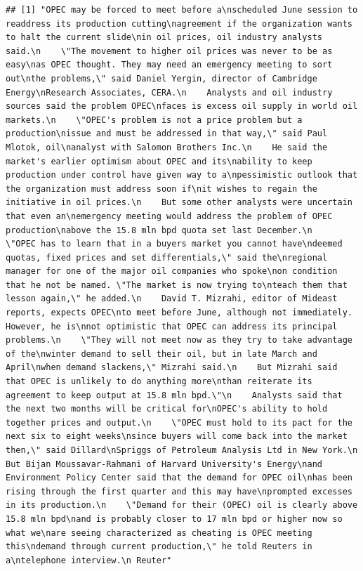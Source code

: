 \documentclass[]{book}
\begin{document}
\begin{verbatim}
## [1] "OPEC may be forced to meet before a\nscheduled June session to readdress its production cutting\nagreement if the organization wants to halt the current slide\nin oil prices, oil industry analysts said.\n    \"The movement to higher oil prices was never to be as easy\nas OPEC thought. They may need an emergency meeting to sort out\nthe problems,\" said Daniel Yergin, director of Cambridge Energy\nResearch Associates, CERA.\n    Analysts and oil industry sources said the problem OPEC\nfaces is excess oil supply in world oil markets.\n    \"OPEC's problem is not a price problem but a production\nissue and must be addressed in that way,\" said Paul Mlotok, oil\nanalyst with Salomon Brothers Inc.\n    He said the market's earlier optimism about OPEC and its\nability to keep production under control have given way to a\npessimistic outlook that the organization must address soon if\nit wishes to regain the initiative in oil prices.\n    But some other analysts were uncertain that even an\nemergency meeting would address the problem of OPEC production\nabove the 15.8 mln bpd quota set last December.\n    \"OPEC has to learn that in a buyers market you cannot have\ndeemed quotas, fixed prices and set differentials,\" said the\nregional manager for one of the major oil companies who spoke\non condition that he not be named. \"The market is now trying to\nteach them that lesson again,\" he added.\n    David T. Mizrahi, editor of Mideast reports, expects OPEC\nto meet before June, although not immediately. However, he is\nnot optimistic that OPEC can address its principal problems.\n    \"They will not meet now as they try to take advantage of the\nwinter demand to sell their oil, but in late March and April\nwhen demand slackens,\" Mizrahi said.\n    But Mizrahi said that OPEC is unlikely to do anything more\nthan reiterate its agreement to keep output at 15.8 mln bpd.\"\n    Analysts said that the next two months will be critical for\nOPEC's ability to hold together prices and output.\n    \"OPEC must hold to its pact for the next six to eight weeks\nsince buyers will come back into the market then,\" said Dillard\nSpriggs of Petroleum Analysis Ltd in New York.\n    But Bijan Moussavar-Rahmani of Harvard University's Energy\nand Environment Policy Center said that the demand for OPEC oil\nhas been rising through the first quarter and this may have\nprompted excesses in its production.\n    \"Demand for their (OPEC) oil is clearly above 15.8 mln bpd\nand is probably closer to 17 mln bpd or higher now so what we\nare seeing characterized as cheating is OPEC meeting this\ndemand through current production,\" he told Reuters in a\ntelephone interview.\n Reuter"
\end{verbatim}
\end{document}
